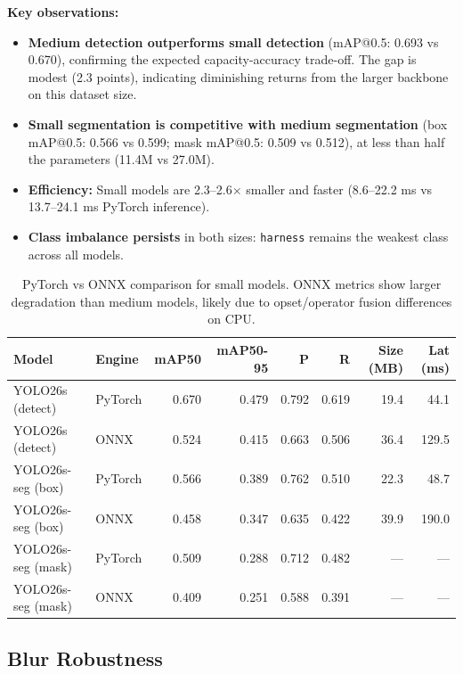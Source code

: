 \documentclass[a4paper,11pt]{article}
\begin{document}
\textbf{Key observations:}
\begin{itemize}[leftmargin=2cm, itemsep=2pt]
  \item \textbf{Medium detection outperforms small detection} (mAP@0.5: 0.693 vs 0.670), confirming the expected capacity-accuracy trade-off. The gap is modest (2.3 points), indicating diminishing returns from the larger backbone on this dataset size.
  \item \textbf{Small segmentation is competitive with medium segmentation} (box mAP@0.5: 0.566 vs 0.599; mask mAP@0.5: 0.509 vs 0.512), at less than half the parameters (11.4M vs 27.0M).
  \item \textbf{Efficiency:} Small models are 2.3--2.6$\times$ smaller and faster (8.6--22.2 ms vs 13.7--24.1 ms PyTorch inference).
  \item \textbf{Class imbalance persists} in both sizes: \texttt{harness} remains the weakest class across all models.
\end{itemize}

\begin{table}[H]
\centering
\small
\begin{tabular}{llrrrrrr}
\toprule
\textbf{Model} & \textbf{Engine} & \textbf{mAP50} & \textbf{mAP50-95} & \textbf{P} & \textbf{R} & \textbf{Size (MB)} & \textbf{Lat (ms)} \\
\midrule
YOLO26s (detect) & PyTorch & 0.670 & 0.479 & 0.792 & 0.619 & 19.4 & 44.1 \\
YOLO26s (detect) & ONNX & 0.524 & 0.415 & 0.663 & 0.506 & 36.4 & 129.5 \\
\midrule
YOLO26s-seg (box) & PyTorch & 0.566 & 0.389 & 0.762 & 0.510 & 22.3 & 48.7 \\
YOLO26s-seg (box) & ONNX & 0.458 & 0.347 & 0.635 & 0.422 & 39.9 & 190.0 \\
\midrule
YOLO26s-seg (mask) & PyTorch & 0.509 & 0.288 & 0.712 & 0.482 & --- & --- \\
YOLO26s-seg (mask) & ONNX & 0.409 & 0.251 & 0.588 & 0.391 & --- & --- \\
\bottomrule
\end{tabular}
\caption{PyTorch vs ONNX comparison for small models. ONNX metrics show larger degradation than medium models, likely due to opset/operator fusion differences on CPU.}
\label{tab:onnx-small}
\end{table}

\subsection{Blur Robustness}
\end{document}
